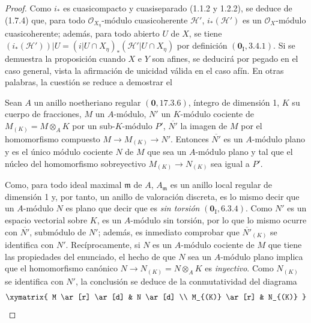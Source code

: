 \begin{proof}
Como $i_*$ es cuasicompacto y cuasiseparado (1.1.2 y 1.2.2), se deduce de
(1.7.4) que, para todo $\mathcal O_{X_\eta}$-módulo cuasicoherente
$\mathcal H'$, $i_*(\mathcal H')$ es un $\mathcal O_X$-módulo
cuasicoherente; además, para todo abierto $U$ de $X$, se tiene
$(i_*(\mathcal H'))|U=(i|U\cap X_\eta)_*(\mathcal H'|U\cap X_\eta)$
por definición $(\mathbf{0}_{\mathrm I},3.4.1)$. Si se demuestra la proposición cuando
$X$ e $Y$ son afines, se deducirá por pegado en el caso general, vista la
afirmación de unicidad válida en el caso afín. En otras palabras, la cuestión se reduce
a demostrar el

\begin{lemma}[2.8.1.1]
\label{IV.2.8.1.1-fr}
Sean $A$ un anillo noetheriano regular $(\mathbf{0},17.3.6)$, íntegro de dimensión
1, $K$ su cuerpo de fracciones, $M$ un $A$-módulo, $N'$ un $K$-módulo
cociente de $M_{(K)}=M\otimes_A K$ por un sub-$K$-módulo $P'$,
$\overline{N'}$ la imagen de $M$ por el homomorfismo compuesto
$M\to M_{(K)}\to N'$. Entonces $\overline{N'}$ es un $A$-módulo plano y es
el único módulo cociente $N$ de $M$ que sea un $A$-módulo plano y tal que el
núcleo del homomorfismo sobreyectivo $M_{(K)}\to N_{(K)}$ sea igual a $P'$.
\end{lemma}

Como, para todo ideal maximal $\mathfrak m$ de $A$, $A_{\mathfrak m}$ es un
anillo local regular de dimensión 1 y, por tanto, un anillo de valoración
discreta, es lo mismo decir que un $A$-módulo $N$ es plano que decir que es
\emph{sin torsión} $(\mathbf{0}_{\mathrm I},6.3.4)$. Como $N'$ es un espacio vectorial
sobre $K$, es un $A$-módulo sin torsión, por lo que lo mismo ocurre con
$\overline{N'}$, submódulo de $N'$; además, es inmediato comprobar que
$\overline{N'}_{(K)}$ se identifica con $N'$. Recíprocamente, si $N$ es un
$A$-módulo cociente de $M$ que tiene las propiedades del enunciado, el hecho de
que $N$ sea un $A$-módulo plano implica que el homomorfismo canónico
$N\to N_{(K)}=N\otimes_A K$ es \emph{inyectivo}. Como $N_{(K)}$ se identifica con
$N'$, la conclusión se deduce de la conmutatividad del diagrama
\[
\xymatrix{
M \ar[r] \ar[d] & N \ar[d] \\
M_{(K)} \ar[r] & N_{(K)}
}
\]
\end{proof}

